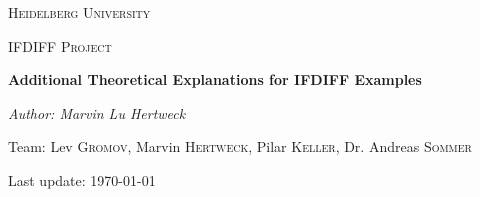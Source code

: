 
\begin{titlepage}
	\centering
	{\scshape\LARGE Heidelberg University \par}
	\vspace{1cm}
	{\scshape\Large IFDIFF Project\par}
	\vspace{1.5cm}
	{\huge\bfseries Additional Theoretical Explanations for IFDIFF Examples \par}
	\vspace{2cm}
	{\Large\itshape Author: Marvin Lu Hertweck \par}
	\vfill
	Team: Lev \textsc{Gromov}, Marvin \textsc{Hertweck}, Pilar \textsc{Keller}, Dr. Andreas \textsc{Sommer}
	
	\vfill
	
	{\large Last update: \today\par}
\end{titlepage}